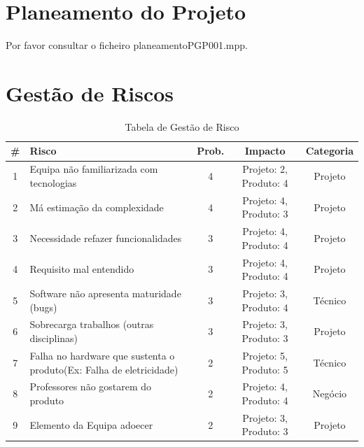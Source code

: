 \documentclass[a4paper]{report}
\begin{document}
\section{Planeamento do Projeto}
Por favor consultar o ficheiro planeamentoPGP001.mpp.
\pagebreak
\section{Gestão de Riscos}
\label{GR}
\begin{table}[h]
\centering
\begin{tabularx}{\textwidth}{c|X|c|c|c}
\# & Risco & Prob. & Impacto & Categoria \\ \hline
1                        & Equipa não familiarizada com tecnologias                            & 4                          & Projeto: 2, Produto: 4       & Projeto                        \\ \hline
2                        & Má estimação da complexidade                                        & 4                          & Projeto: 4, Produto: 3       & Projeto                        \\ \arrayrulecolor{red}\hline\arrayrulecolor{black}
3                        & Necessidade refazer funcionalidades                                 & 3                          & Projeto: 4, Produto: 4       & Projeto                        \\ \hline
4                        & Requisito mal entendido                                             & 3                          & Projeto: 4, Produto: 4       & Projeto                        \\ \hline
5                        & Software não apresenta maturidade (bugs)                            & 3                          & Projeto: 3, Produto: 4       & Técnico                        \\ \hline
6                        & Sobrecarga trabalhos (outras disciplinas)                           & 3                          & Projeto: 3, Produto: 3       & Projeto                        \\ \hline
7                        & Falha no hardware que sustenta o produto(Ex: Falha de eletricidade) & 2                          & Projeto: 5, Produto: 5       & Técnico                        \\ \hline
8                        & Professores não gostarem do produto                                 & 2                          & Projeto: 4, Produto: 4       & Negócio                        \\ \hline
9                        & Elemento da Equipa adoecer                                          & 2                          & Projeto: 3, Produto: 3       & Projeto   
\end{tabularx}
\caption{Tabela de Gestão de Risco}
\label{TabGR}
\end{table}
\end{document}
